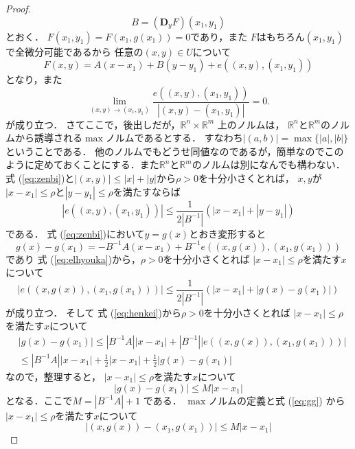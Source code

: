 \documentclass[leqno, a4paper, 12pt]{jsarticle}
\newcommand{\rr}{\mathbb{R}}
\newcommand{\ddd}{\mathbf{D}}
\begin{document}
\begin{proof}
\[
B=(\ddd_{y}F)(x_{1}, y_{1})
\]
とおく．
$F(x_{1}, y_{1})=F(x_{1}, g(x_{1}))=0$であり，また
$F$はもちろん$(x_{1}, y_{1})$で全微分可能であるから
任意の$(x, y)\in U$について
\begin{equation}\label{eq:zenbi}
F(x, y)=A(x-x_{1})+B(y-y_{1})+e((x, y), (x_{1}, y_{1}))
\end{equation}
となり，また
\begin{equation}
\lim_{(x, y)\to (x_{1}, y_{1})}
\frac{e((x, y), (x_{1}, y_{1}))}{|(x, y)-(x_{1}, y_{1})|}
=0. 
\end{equation}
が成り立つ．
さてここで，後出しだが，$\rr^{n}\times \rr^{m}$
上のノルムは，
$\rr^{n}$と$\rr^{m}$のノルムから誘導される$\max$ノルムであるとする．
すなわち$|(a, b)|=\max\{|a|, |b|\}$ということである．
他のノルムでもどうせ同値なのであるが，簡単なのでこのように定めておくことにする．また$\rr^{n}$と$\rr^{m}$のノルムは別になんでも構わない．
式 (\ref{eq:zenbi})と$|(x, y)|\le |x|+|y|$から$\rho>0$を十分小さくとれば，
$x, y$が$|x-x_{1}|\le \rho$と$|y-y_{1}|\le \rho$を満たすならば
\begin{equation}\label{eq:elhyouka}
|e((x, y), (x_{1}, y_{1}))|
\le 
\frac{1}{2|B^{-1}|}(|x-x_{1}|+|y-y_{1}|)
\end{equation}
である．
式 (\ref{eq:zenbi})において$y=g(x)$とおき変形すると
\begin{equation}\label{eq:henkei}
g(x)-g(x_{1})=-B^{-1}A(x-x_{1})+B^{-1}e((x, g(x)), (x_{1}, g(x_{1})))
\end{equation}
であり
式 (\ref{eq:elhyouka})から，$\rho>0$を十分小さくとれば
$|x-x_{1}|\le \rho$を満たす$x$について
\begin{equation}\label{eq:exhyouka}
|e((x, g(x)), (x_{1}, g(x_{1})))|
\le 
\frac{1}{2|B^{-1}|}(|x-x_{1}|+|g(x)-g(x_{1})|)
\end{equation}
が成り立つ．
そして
式 (\ref{eq:henkei})から$\rho>0$を十分小さくとれば
$|x-x_{1}|\le \rho$を満たす$x$について
\begin{align*}
&|g(x)-g(x_{1})|\le 
|B^{-1}A||x-x_{1}|
+|B^{-1}||e((x, g(x)), (x_{1}, g(x_{1})))|\\
&\le |B^{-1}A||x-x_{1}|+\frac{1}{2}|x-x_{1}|
+\frac{1}{2}|g(x)-g(x_{1})|
\end{align*}
なので，整理すると，
$|x-x_{1}|\le \rho$を満たす$x$について
\begin{equation}\label{eq:gg}
|g(x)-g(x_{1})|\le M|x-x_{1}|
\end{equation}
となる．ここで$M=|B^{-1}A|+1$
である．
$\max$ノルムの定義と式 (\ref{eq:gg})
から$|x-x_{1}|\le \rho$を満たす$x$について
\[
|(x, g(x))-(x_{1}, g(x_{1}))|\le M|x-x_{1}|
\]
\end{proof}
\end{document}
